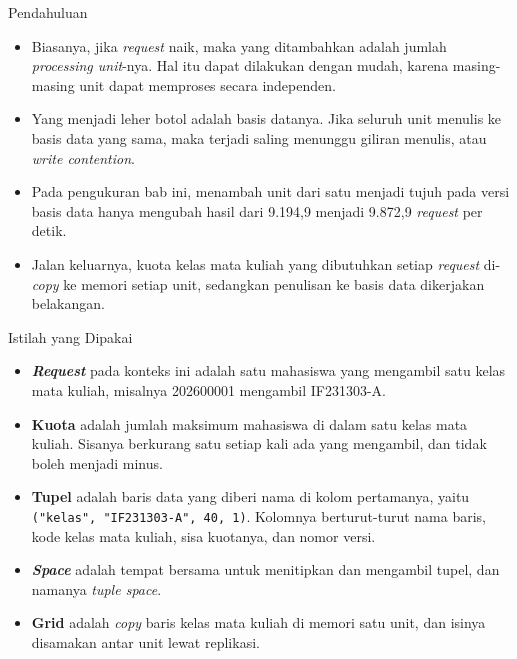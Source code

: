 \documentclass[aspectratio=169, table, 12pt]{beamer}
\begin{document}
\begin{frame}{{\Large Pendahuluan}}
  \vspace{10pt}
  \begin{itemize}\small
    \item Biasanya, jika \textit{request} naik, maka yang ditambahkan adalah
          jumlah \textit{processing unit}-nya. Hal itu dapat dilakukan dengan
          mudah, karena masing-masing unit dapat memproses secara independen.
    \item Yang menjadi leher botol adalah basis datanya. Jika seluruh
          unit menulis ke basis data yang sama, maka terjadi saling menunggu
          giliran menulis, atau \textit{write contention}.
    \item Pada pengukuran bab ini, menambah unit dari satu menjadi tujuh
          pada versi basis data hanya mengubah hasil dari 9.194,9 menjadi
          9.872,9 \textit{request} per detik.
    \item Jalan keluarnya, kuota kelas mata kuliah yang dibutuhkan setiap \textit{request}
          di-\textit{copy} ke memori setiap unit, sedangkan penulisan ke basis
          data dikerjakan belakangan.
  \end{itemize}
\end{frame}

\begin{frame}{{\Large Istilah yang Dipakai}}
  \vspace{10pt}
  \begin{itemize}\small
    \item \textbf{\textit{Request}} pada konteks ini adalah satu mahasiswa yang
          mengambil satu kelas mata kuliah, misalnya 202600001 mengambil IF231303-A.
    \item \textbf{Kuota} adalah jumlah maksimum mahasiswa di dalam satu
          kelas mata kuliah. Sisanya berkurang satu setiap kali ada yang
          mengambil, dan tidak boleh menjadi minus.
    \item \textbf{Tupel} adalah baris data yang diberi nama di kolom
          pertamanya, yaitu \texttt{("kelas", "IF231303-A", 40, 1)}. Kolomnya
          berturut-turut nama baris, kode kelas mata kuliah, sisa kuotanya, dan
          nomor versi.
    \item \textbf{\textit{Space}} adalah tempat bersama untuk menitipkan dan
          mengambil tupel, dan namanya \textit{tuple space}.
    \item \textbf{Grid} adalah \textit{copy} baris kelas mata kuliah di memori satu unit,
          dan isinya disamakan antar unit lewat replikasi.
  \end{itemize}
\end{frame}
\end{document}
